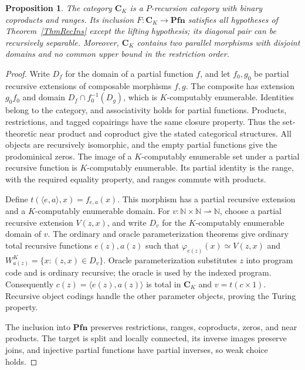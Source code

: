 \documentclass[letterpaper,10pt]{amsart}
\theoremstyle{plain}
\newtheorem{prop}{Proposition}[thm]
\theoremstyle{definition}
\begin{document}
\begin{prop}\label{PropCounterexample}
The category $\mathbf C_K$ is a $P$-recursion category with binary
coproducts and ranges. Its inclusion $F:\mathbf C_K\to\mathbf{Pfn}$
satisfies all hypotheses of Theorem~\ref{ThmRecIns} except the lifting
hypothesis; its diagonal pair can be recursively separable.
Moreover, $\mathbf C_K$ contains two parallel morphisms with disjoint
domains and no common upper bound in the restriction order.
\end{prop}
\begin{proof}
Write $D_f$ for the domain of a partial function $f$, and let $f_0,g_0$
be partial recursive extensions of composable morphisms $f,g$.
The composite has extension $g_0f_0$ and domain
$D_f\cap f_0^{-1}(D_g)$, which is $K$-computably enumerable.
Identities belong to the category, and associativity holds for partial
functions. Products, restrictions, and tagged copairings have the same
closure property. Thus the set-theoretic near product and coproduct give
the stated categorical structures. All objects are recursively isomorphic,
and the empty partial functions give the prodominical zeros.
The image of a $K$-computably enumerable set under a partial recursive
function is $K$-computably enumerable. Its partial identity is the range,
with the required equality property, and ranges commute with products.

Define $t(\langle e,a\rangle,x)=f_{e,a}(x)$. This morphism has a
partial recursive extension and a $K$-computably enumerable domain.
For $v:\mathbb N\times\mathbb N\rightharpoonup\mathbb N$, choose a
partial recursive extension $V(z,x)$, and write $D_v$ for the
$K$-computably enumerable domain of $v$. The ordinary and oracle
parameterization theorems \cite{MR90d:03072} give
ordinary total recursive functions $e(z),a(z)$ such that
$\varphi_{e(z)}(x)\simeq V(z,x)$ and
$W_{a(z)}^K=\{x:(z,x)\in D_v\}$.
Oracle parameterization substitutes $z$ into program code and is
ordinary recursive; the oracle is used by the indexed program.
Consequently $c(z)=\langle e(z),a(z)\rangle$ is total in $\mathbf C_K$
and $v=t(c\times1)$. Recursive object codings handle the other
parameter objects, proving the Turing property.

The inclusion into $\mathbf{Pfn}$ preserves restrictions, ranges,
coproducts, zeros, and near products. The target is split and locally
connected, its inverse images preserve joins, and injective partial
functions have partial inverses, so weak choice holds.


\end{proof}
\end{document}
